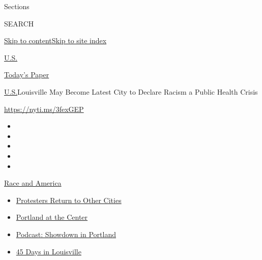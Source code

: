 Sections

SEARCH

\protect\hyperlink{site-content}{Skip to
content}\protect\hyperlink{site-index}{Skip to site index}

\href{https://www.nytimes3xbfgragh.onion/section/us}{U.S.}

\href{https://myaccount.nytimes3xbfgragh.onion/auth/login?response_type=cookie\&client_id=vi}{}

\href{https://www.nytimes3xbfgragh.onion/section/todayspaper}{Today's
Paper}

\href{/section/us}{U.S.}\textbar{}Louisville May Become Latest City to
Declare Racism a Public Health Crisis

\url{https://nyti.ms/3fexGEP}

\begin{itemize}
\item
\item
\item
\item
\item
\end{itemize}

\href{https://www.nytimes3xbfgragh.onion/news-event/george-floyd-protests-minneapolis-new-york-los-angeles?action=click\&pgtype=Article\&state=default\&region=TOP_BANNER\&context=storylines_menu}{Race
and America}

\begin{itemize}
\tightlist
\item
  \href{https://www.nytimes3xbfgragh.onion/2020/07/26/us/protests-portland-seattle-trump.html?action=click\&pgtype=Article\&state=default\&region=TOP_BANNER\&context=storylines_menu}{Protesters
  Return to Other Cities}
\item
  \href{https://www.nytimes3xbfgragh.onion/2020/07/24/us/portland-oregon-protests-white-race.html?action=click\&pgtype=Article\&state=default\&region=TOP_BANNER\&context=storylines_menu}{Portland
  at the Center}
\item
  \href{https://www.nytimes3xbfgragh.onion/2020/07/23/podcasts/the-daily/portland-protests.html?action=click\&pgtype=Article\&state=default\&region=TOP_BANNER\&context=storylines_menu}{Podcast:
  Showdown in Portland}
\item
  \href{https://www.nytimes3xbfgragh.onion/interactive/2020/07/16/us/black-lives-matter-protests-louisville-breonna-taylor.html?action=click\&pgtype=Article\&state=default\&region=TOP_BANNER\&context=storylines_menu}{45
  Days in Louisville}
\end{itemize}

